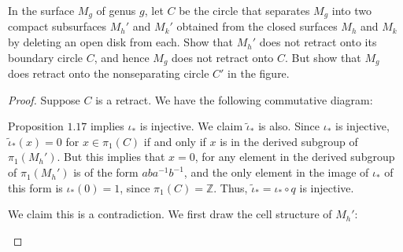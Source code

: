 \documentclass[12pt]{article}
\theoremstyle{remark}
\begin{document}
\setcounter{subsubsection}{8}
\begin{problem}
  In the surface $M_g$ of genus $g$, let $C$ be the circle that separates $M_g$ into two compact subsurfaces $M_h'$ and $M_k'$ obtained from the closed surfaces $M_h$ and $M_k$ by deleting an open disk from each. Show that $M_h'$ does not retract onto its boundary circle $C$, and hence $M_g$ does not retract onto $C$. But show that $M_g$ does retract onto the nonseparating circle $C'$ in the figure.
\end{problem}
\begin{proof}
  Suppose $C$ is a retract. We have the following commutative diagram:
  \begin{center}
  \end{center}
  Proposition $1.17$ implies $\iota_*$ is injective. We claim $\tilde{\iota}_*$
  is also. Since $\iota_*$ is injective, $\tilde{\iota}_*(x) = 0$ for $x \in
  \pi_1(C)$ if and only if $x$ is in the derived subgroup of $\pi_1(M_h')$. But
  this implies that $x=0$, for any element in the derived subgroup of
  $\pi_1(M_h')$ is of the form $aba^{-1}b^{-1}$, and the only element in the
  image of $\iota_*$ of this form is $\iota_*(0) = 1$, since $\pi_1(C) =
  \mathbb{Z}$. Thus, $\tilde{\iota}_* = \iota_* \circ q$ is injective.
  \par We claim this is a contradiction. We first draw the cell structure of $M_h'$:
  \begin{center}
\end{center}
\end{proof}
\end{document}

